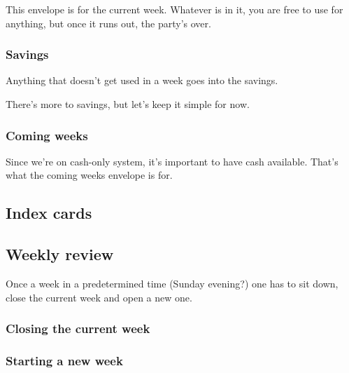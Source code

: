 This envelope is for the current week. Whatever is in it, you are free to use for anything, but once it runs out, the party's over.

\subsubsection{\color{Savings} Savings}

Anything that doesn't get used in a week goes into the savings.

\begin{note}
  There's more to savings, but let's keep it simple for now.
\end{note}

\subsubsection{\color{ComingWeeks} Coming weeks}

Since we're on cash-only system, it's important to have cash available. That's what the coming weeks envelope is for.

\subsection{Index cards}


\subsection{Weekly review}

Once a week in a predetermined time (Sunday evening?) one has to sit down, close the current week and open a new one.

\subsubsection{Closing the current week}

\subsubsection{Starting a new week}